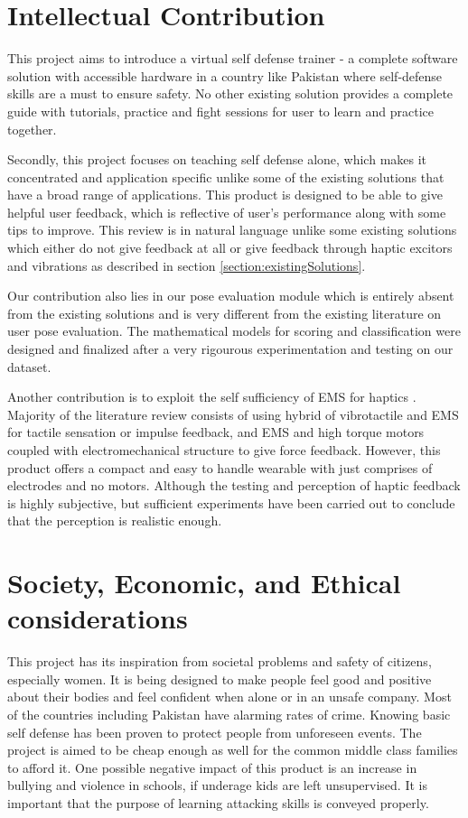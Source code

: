 \section{Intellectual Contribution}

This project aims to introduce a virtual self defense trainer - a complete software solution with accessible hardware in a country like Pakistan where self-defense skills are a must to ensure safety. No other existing solution provides a complete guide with tutorials, practice and fight sessions for user to learn and practice together. 

Secondly, this project focuses on teaching self defense alone, which makes it concentrated and application specific unlike some of the existing solutions that have a broad range of applications. This product is designed to be able to give helpful user feedback, which is reflective of user's performance along with some tips to improve. This review is in natural language unlike some existing solutions which either do not give feedback at all or give feedback through haptic excitors and vibrations as described in section \ref{section:existingSolutions}. 

Our contribution also lies in our pose evaluation module which is entirely absent from the existing solutions and is very different from the existing literature on user pose evaluation. The mathematical models for scoring and classification were designed and finalized after a very rigourous experimentation and testing on our dataset. 

Another contribution is to exploit the self sufficiency of EMS for haptics \cite{EMSLopes}. Majority of the literature review consists of using hybrid of vibrotactile and EMS for tactile sensation or impulse feedback, and EMS and high torque motors coupled with electromechanical structure to give force feedback. However, this product offers a compact and easy to handle wearable with just comprises of electrodes and no motors. Although the testing and perception of haptic feedback is highly subjective, but sufficient experiments have been carried out to conclude that the perception is realistic enough. 

\section{Society, Economic, and Ethical considerations}

This project has its inspiration from societal problems and safety of citizens, especially women. It is being designed to make people feel good and positive about their bodies and feel confident when alone or in an unsafe company. Most of the countries including Pakistan have alarming rates of crime. Knowing basic self defense has been proven to protect people from unforeseen events. The project is aimed to be cheap enough as well for the common middle class families to afford it. One possible negative impact of this product is an increase in bullying and violence in schools, if underage kids are left unsupervised. It is important that the purpose of learning attacking skills is conveyed properly. 


